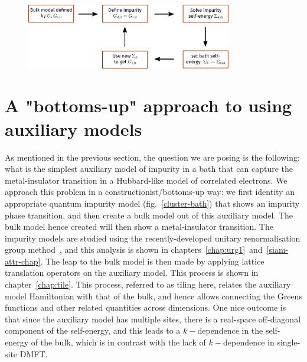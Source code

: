 \documentclass{report}
\numberwithin{equation}{section}
\begin{document}
\begin{figure}[!htb]
	\centering
	\includegraphics[width=0.8\textwidth]{../figures/dmft.pdf}
\end{figure}


\section{A "bottoms-up" approach to using auxiliary models}
As mentioned in the previous section, the question we are posing is the following: what is the simplest auxiliary model of impurity in a bath that can capture the metal-insulator transition in a Hubbard-like model of correlated electrons. We approach this problem in a constructionist/bottoms-up way: we first identity an appropriate quantum impurity model (fig.~\ref{cluster-bath}) that shows an impurity phase transition, and then create a bulk model out of this auxiliary model. The bulk model hence created will then show a metal-insulator transition. The impurity models are studied using the recently-developed unitary renormalisation group method~\cite{anirbanmott1,anirbanmott2,anirbanurg1,anirbanurg2,siddharthacpi,santanukagome}, and this analysis is shown in chapters~\ref{chap:urg1}~and~\ref{siam-attr-chap}. The leap to the bulk model is then made by applying lattice translation operators on the auxiliary model. This process is shown in chapter~\ref{chap:tile}. This process, referred to as tiling here, relates the auxiliary model Hamiltonian with that of the bulk, and hence allows connecting the Greens functions and other related quantities across dimensions. One nice outcome is that since the auxiliary model has multiple sites, there is a real-space off-diagonal component of the self-energy, and this leads to a \(k-\)dependence in the self-energy of the bulk, which is in contrast with the lack of \(k-\)dependence in single-site DMFT.  
\end{document}
